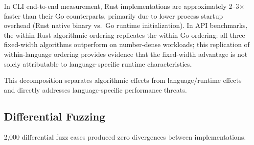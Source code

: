 In CLI end-to-end measurement, Rust implementations are approximately
2--3$\times$ faster than their Go counterparts, primarily due to lower
process startup overhead (Rust native binary vs.\ Go runtime
initialization).  In API benchmarks, the within-Rust algorithmic ordering
replicates the within-Go ordering: all three fixed-width algorithms
outperform \burgerdybvig on number-dense workloads; this replication
of within-language ordering provides evidence that the fixed-width
advantage is not solely attributable to language-specific runtime
characteristics.

This decomposition separates algorithmic effects from language/runtime
effects and directly addresses language-specific performance threats.

\subsection{Differential Fuzzing}

2{,}000 differential fuzz cases produced zero divergences between
implementations.
